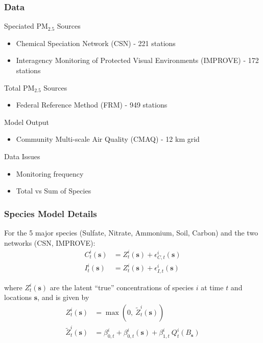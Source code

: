 \documentclass[t]{beamer}\usepackage[]{graphicx}\usepackage[]{color}
\newcommand{\PM}{$\text{PM}_{2.5}$ }
\begin{document}

\begin{frame}
\frametitle{Data}

Speciated \PM Sources
\begin{itemize}
  \item Chemical Speciation Network (CSN) - 221 stations
  \item Interagency Monitoring of Protected Visual Environments (IMPROVE) - 172 stations
\end{itemize}

\vspace{2mm}

Total \PM Sources
\begin{itemize}
  \item Federal Reference Method (FRM) - 949 stations
\end{itemize}

\vspace{2mm}

Model Output
\begin{itemize}
  \item Community Multi-scale Air Quality (CMAQ) - 12 km grid
\end{itemize}

\vspace{5mm}

Data Issues
\begin{itemize}
  \item Monitoring frequency
  \item Total vs Sum of Species
\end{itemize}

\end{frame}



\begin{frame}
\frametitle{Species Model Details}

For the 5 major species (Sulfate, Nitrate, Ammonium, Soil, Carbon) and the two networks (CSN, IMPROVE):
%
\begin{align*}
C_t^i(\bm{s}) &= Z_t^i(\bm{s}) + \epsilon_{C,t}^i(\bm{s}) \\
I_t^i(\bm{s}) &= Z_t^i(\bm{s}) + \epsilon_{I,t}^i(\bm{s})
\end{align*}

where $Z_t^i(\bm{s})$ are the latent ``true'' concentrations of species $i$ at time $t$ and locations $\bm{s}$, and is given by
%
\begin{align*}
{Z}_t^i(\bm{s}) &= \max{}\left(0,~\widetilde{Z}_t^i(\bm{s})\right) \\
\widetilde{Z}_t^i(\bm{s}) &= \beta_{0,t}^i +\beta_{0,t}^i(\bm{s}) + \beta_{1,t}^i \: Q_t^i(B_{\bm{s}})  
\end{align*}


\end{frame}
\end{document}
